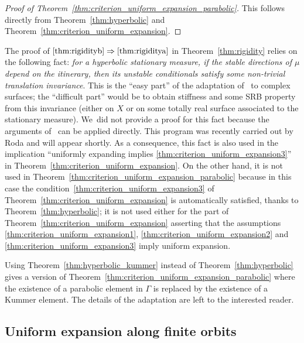 \begin{proof}[Proof of Theorem~\ref{thm:criterion_uniform_expansion_parabolic}]
This follows directly from Theorem~\ref{thm:hyperbolic} and Theorem~\ref{thm:criterion_uniform_expansion}.
\end{proof}

\begin{rem}\label{rmk:conditional}
The proof of $\eqref{thm:rigidityb}\Rightarrow\eqref{thm:rigiditya}$ in Theorem~\ref{thm:rigidity} relies on the following fact: {\textit{for a hyperbolic stationary measure, if the stable directions of $\mu$ depend on the itinerary, then its unstable conditionals satisfy some non-trivial translation invariance}}. This is the
``easy part'' of the adaptation of~\cite{br} to complex surfaces; the ``difficult part'' would be to obtain
stiffness and some SRB property from this invariance (either on $X$ or on some totally real surface associated to the stationary measure). We~did not provide a proof for this fact because the arguments of~\cite{br} can be applied directly. This program was recently carried out by Roda and will appear shortly.
As a consequence, this fact is also used in the implication ``uniformly expanding implies \eqref{thm:criterion_uniform_expansion3}'' in
Theorem~\ref{thm:criterion_uniform_expansion}. On the other hand, it is not used in Theorem~\ref{thm:criterion_uniform_expansion_parabolic} because in this case the condition~\eqref{thm:criterion_uniform_expansion3} of
Theorem~\ref{thm:criterion_uniform_expansion} is automatically
satisfied, thanks to Theorem~\ref{thm:hyperbolic}; it is not used either for the part of Theorem~\ref{thm:criterion_uniform_expansion} asserting that the assumptions \eqref{thm:criterion_uniform_expansion1}, \eqref{thm:criterion_uniform_expansion2} and \eqref{thm:criterion_uniform_expansion3} imply uniform expansion.
\end{rem}

\begin{rem}
Using Theorem~\ref{thm:hyperbolic_kummer} instead of Theorem~\ref{thm:hyperbolic} gives a version of
Theorem~\ref{thm:criterion_uniform_expansion_parabolic} where the existence of a parabolic element in $\Gamma$ is replaced by the existence of a Kummer element. The details of the adaptation are left to the interested reader.
\end{rem}

\subsection{Uniform expansion along finite orbits}\label{subs:finite_orbits}

